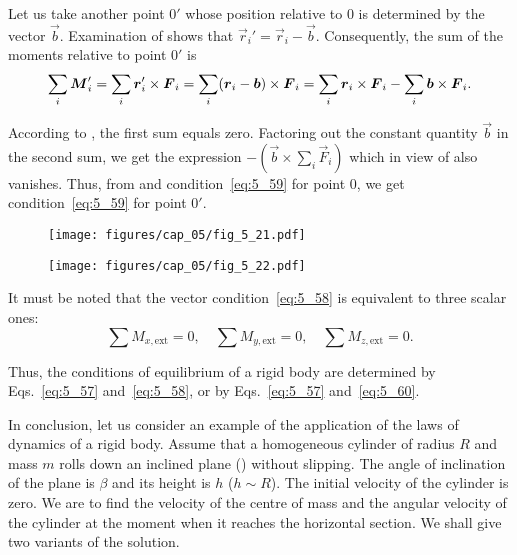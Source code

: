 \noindent
Let us take another point $0'$ whose position relative to $0$ is determined by the vector $\vec{b}$. Examination of  shows that $\vec{r}_i'=\vec{r}_i-\vec{b}$. Consequently, the sum of the moments relative to point $0'$ is
\begin{equation*}
	\sum_i\boldsymbol{M}_{i}' = \sum_i \boldsymbol{r}_i'\times\boldsymbol{F}_i = \sum_i (\boldsymbol{r}_i-\boldsymbol{b})\times\boldsymbol{F}_i = \sum_i\boldsymbol{r}_{i}\times\boldsymbol{F}_{i} - \sum_i\boldsymbol{b}\times\boldsymbol{F}_i.
\end{equation*}

\noindent
According to , the first sum equals zero. Factoring out the constant quantity $\vec{b}$ in the second sum, we get the expression $-\left(\vec{b}\times\sum_i\vec{F}_i\right)$ which in view of  also vanishes. Thus, from  and condition~\eqref{eq:5_59} for point $0$, we get condition~\eqref{eq:5_59} for point $0'$.

\begin{figure}[t]
	\begin{minipage}[t]{0.27\linewidth}
		\begin{center}
			\texttt{[image: figures/cap\_05/fig\_5\_21.pdf]}
			\caption[]{}
			\label{fig:5_21}
		\end{center}
	\end{minipage}
	\hspace{-0.05cm}
	\begin{minipage}[t]{0.7\linewidth}
		\begin{center}
			\texttt{[image: figures/cap\_05/fig\_5\_22.pdf]}
			\caption[]{}
			\label{fig:5_22}
		\end{center}
	\end{minipage}
	\vspace{-0.7cm}
\end{figure}

It must be noted that the vector condition~\eqref{eq:5_58} is equivalent to three scalar ones:
\begin{equation}\label{eq:5_60}
	\sum M_{x,\text{ext}} = 0 ,\quad \sum M_{y,\text{ext}} = 0 ,\quad \sum M_{z,\text{ext}} = 0.
\end{equation}

Thus, the conditions of equilibrium of a rigid body are determined by Eqs.~\eqref{eq:5_57} and~\eqref{eq:5_58}, or by Eqs.~\eqref{eq:5_57} and~\eqref{eq:5_60}.

In conclusion, let us consider an example of the application of the laws of dynamics of a rigid body. Assume that a homogeneous cylinder of radius $R$ and mass $m$ rolls down an inclined plane () without slipping. The angle of inclination of the plane is $\beta$ and its height is $h$ ($h\sim R$). The initial velocity of the cylinder is zero. We are to find the velocity of the centre of mass and the angular velocity of the cylinder at the moment when it reaches the horizontal section. We shall give two variants of the solution.

